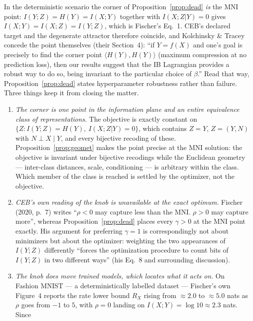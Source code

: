 \begin{remark}\label{rem:mni}
In the deterministic scenario the corner of Proposition~\ref{prop:dead} \emph{is} the MNI
point: $I(Y;Z) = H(Y) = I(X;Y)$ together with $I(X;Z|Y) = 0$ gives
$I(X;Y) = I(X;Z) = I(Y;Z)$, which is Fischer's Eq.~1. CEB's declared target and the
degenerate attractor therefore coincide, and Kolchinsky \& Tracey concede the point
themselves (their Section~4): ``if $Y = f(X)$ and one's goal is precisely to find the corner
point $\langle H(Y), H(Y)\rangle$ (maximum compression at no prediction loss), then our
results suggest that the IB Lagrangian provides a robust way to do so, being invariant to
the particular choice of $\beta$.'' Read that way, Proposition~\ref{prop:dead} states
hyperparameter robustness rather than failure. Three things keep it from closing the matter.
\begin{enumerate}
\item[(i)] \emph{The corner is one point in the information plane and an entire equivalence
class of representations.} The objective is exactly constant on
$\{Z : I(Y;Z) = H(Y),\ I(X;Z|Y) = 0\}$, which contains $Z = Y$, $Z = (Y,N)$ with
$N \perp X \mid Y$, and every bijective recoding of these. Proposition~\ref{prop:geomet}
makes the point precise at the MNI solution: the objective is invariant under bijective
recodings while the Euclidean geometry --- inter-class distances, scale, conditioning ---
is arbitrary within the class. Which member of the class is reached is settled by the
optimizer, not the objective.
\item[(ii)] \emph{CEB's own reading of the knob is unavailable at the exact optimum.}
Fischer (2020, p.~7) writes ``$\rho < 0$ may capture less than the MNI. $\rho > 0$ may
capture more'', whereas Proposition~\ref{prop:dead} places every $\gamma > 0$ at the MNI
point exactly. His argument for preferring $\gamma = 1$ is correspondingly not about
minimizers but about the optimizer: weighting the two appearances of $I(Y;Z)$ differently
``forces the optimization procedure to count bits of $I(Y;Z)$ in two different ways'' (his
Eq.~8 and surrounding discussion).
\item[(iii)] \emph{The knob does move trained models, which locates what it acts on.} On
Fashion MNIST --- a deterministically labelled dataset --- Fischer's own Figure~4 reports
the rate lower bound $R_X$ rising from $\approx 2.0$ to $\approx 5.0$ nats as $\rho$ goes
from $-1$ to $5$, with $\rho = 0$ landing on $I(X;Y) = \log 10 \approx 2.3$ nats. Since

\end{enumerate}
\end{remark}
